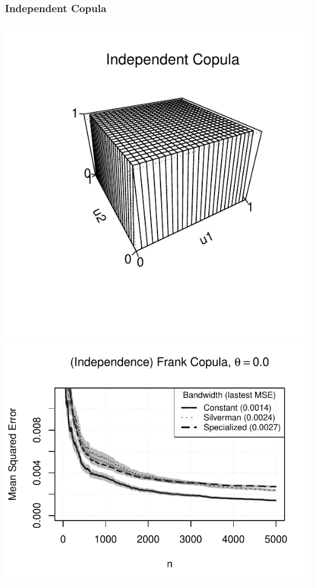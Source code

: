 \documentclass[aspectratio=169]{beamer}
\begin{document}
		\subsubsection{Independent Copula}
			\begin{frame}
				\frametitle{\insertsubsubsection}
				
				\begin{flushleft}
					\includegraphics[width=0.4\linewidth]{plots/numerical_results/frank0}
					\includegraphics[width=0.5\linewidth]{../text/plots/experiment_results/frank0}
				\end{flushleft}
				
			\end{frame}
		
\end{document}
